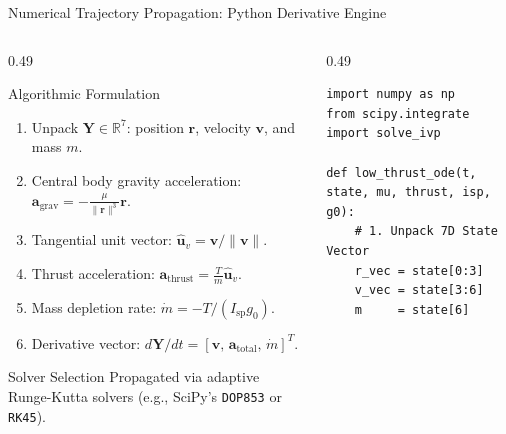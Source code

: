 \documentclass[aspectratio=169, 10pt]{beamer}
\begin{document}
\begin{frame}[fragile]{Numerical Trajectory Propagation: Python Derivative Engine}
    \begin{columns}[T]
        \begin{column}{0.49\textwidth}
            \begin{block}{Algorithmic Formulation}
                \scriptsize
                \begin{enumerate}\setlength{\itemsep}{1.5pt}\setlength{\topsep}{1pt}
                    \item Unpack $\mathbf{Y} \in \mathbb{R}^7$: position $\mathbf{r}$, velocity $\mathbf{v}$, and mass $m$.
                    \item Central body gravity acceleration: $\mathbf{a}_{\text{grav}} = -\frac{\mu}{\|\mathbf{r}\|^3}\mathbf{r}$.
                    \item Tangential unit vector: $\hat{\mathbf{u}}_v = \mathbf{v}/\|\mathbf{v}\|$.
                    \item Thrust acceleration: $\mathbf{a}_{\text{thrust}} = \frac{T}{m} \hat{\mathbf{u}}_v$.
                    \item Mass depletion rate: $\dot{m} = -T / (I_{\text{sp}} g_0)$.
                    \item Derivative vector: $d\mathbf{Y}/dt = [\mathbf{v},\, \mathbf{a}_{\text{total}},\, \dot{m}]^T$.
                \end{enumerate}
            \end{block}
            \vspace{-0.1cm}
            \begin{alertblock}{Solver Selection}
                \scriptsize
                Propagated via adaptive Runge-Kutta solvers (e.g., SciPy's \texttt{DOP853} or \texttt{RK45}).
            \end{alertblock}
        \end{column}

        \begin{column}{0.49\textwidth}
\begin{lstlisting}[style=pythoncode]
import numpy as np
from scipy.integrate import solve_ivp

def low_thrust_ode(t, state, mu, thrust, isp, g0):
    # 1. Unpack 7D State Vector
    r_vec = state[0:3]
    v_vec = state[3:6]
    m     = state[6]
    

\end{lstlisting}
\end{column}
\end{columns}
\end{frame}
\end{document}

